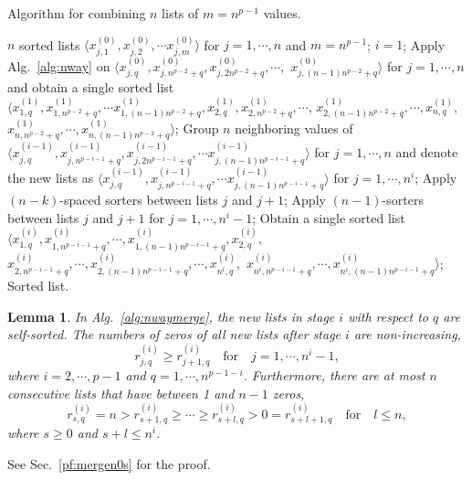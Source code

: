 \documentclass[10pt,journal,cspaper,compsoc]{IEEEtran}
\newtheorem{lemma}{Lemma}[section]
\begin{document}
\begin{algorithm}[!tp]
  \caption{Algorithm for combining $n$ lists of $m=n^{p-1}$ values.}
  \begin{algorithmic}
    \REQUIRE $n$ sorted lists $\langle x^{(0)}_{j,1}, x^{(0)}_{j,2}, \cdots x^{(0)}_{j,m} \rangle$ for $j=1,\cdots,n$ and $m=n^{p-1}$;
    \STATE $i=1$;
            \STATE Apply Alg.~\ref{alg:nway} on $\langle x^{(0)}_{j,q}, x^{(0)}_{j,n^{p-2} + q}, x^{(0)}_{j,2n^{p-2} + q}, \cdots,$ $x^{(0)}_{j,(n - 1) n^{p-2} + q} \rangle$ for $j=1,\cdots,n$ and obtain a single sorted list $\langle x^{(1)}_{1,q}, x^{(1)}_{1,n^{p-2} + q}, \cdots x^{(1)}_{1,(n - 1) n^{p-2} + q}, x^{(1)}_{2,q}, x^{(1)}_{2,n^{p-2} + q}, \cdots$,
            $x^{(1)}_{2,(n - 1) n^{p-2} + q}, \cdots, x^{(1)}_{n,q}$, $x^{(1)}_{n,n^{p-2} + q}, \cdots, x^{(1)}_{n,(n - 1) n^{p-2} + q} \rangle$;
        \ENDFOR
{}
            \STATE Group $n$ neighboring values of $\langle x^{(i-1)}_{j,q}, x^{(i-1)}_{j,n^{p-i-1} + q}, x^{(i-1)}_{j,2n^{p-i-1} + q}, \cdots x^{(i-1)}_{j,(n - 1) n^{p-i-1} + q} \rangle$ for $j=1,\cdots,n$ and denote the new lists as $\langle x^{(i-1)}_{j,q}, x^{(i-1)}_{j,n^{p-i-1} + q}, \cdots x^{(i-1)}_{j,(n-1)n^{p-i-1} + q} \rangle$ for $j=1,\cdots,n^{i}$;
                \STATE Apply $(n-k)$-spaced sorters between lists $j$ and $j+1$;
            \ENDFOR
            \STATE Apply $(n-1)$-sorters between lists $j$ and $j+1$ for $j=1,\cdots,n^{i}-1$;
            \STATE Obtain a single sorted list $\langle x^{(i)}_{1,q}, x^{(i)}_{1,n^{p-i-1} + q}, \cdots, x^{(i)}_{1,(n-1)n^{p-i-1} + q}, x^{(i)}_{2,q},$ $x^{(i)}_{2,n^{p-i-1} + q}, \cdots, x^{(i)}_{2,(n-1)n^{p-i-1} + q}, \cdots, x^{(i)}_{n^i,q},$ $x^{(i)}_{n^i,n^{p-i-1} + q}, \cdots, x^{(i)}_{n^i,(n-1)n^{p-i-1} + q}\rangle$;
        \ENDFOR
    \ENDFOR
    \RETURN Sorted list.
  \end{algorithmic}
  \label{alg:nwaymerge}
\end{algorithm}

\begin{lemma}
  In Alg.~\ref{alg:nwaymerge}, the new lists in stage $i$ with respect to $q$ are self-sorted. The numbers of zeros of all new lists after stage $i$ are non-increasing,
  \[
  r^{(i)}_{j,q} \ge r^{(i)}_{j+1,q} \quad \mbox{for} \quad j=1,\cdots, n^i-1,
  \]
  where $i=2,\cdots, p-1$ and $q=1,\cdots,n^{p-1-i}$. Furthermore, there are at most $n$ consecutive lists that have between 1 and $n-1$ zeros,
  \[
    r^{(i)}_{s,q} = n > r^{(i)}_{s+1,q} \ge \cdots \ge r^{(i)}_{s+l,q} > 0 = r^{(i)}_{s+l+1,q} \quad \mbox{for} \quad l \le n,
\]
  where $s \ge 0$ and $s+l \le n^i$.
\label{lm:mergen0s}
\end{lemma}
See Sec.~\ref{pf:mergen0s} for the proof.
\end{document}
